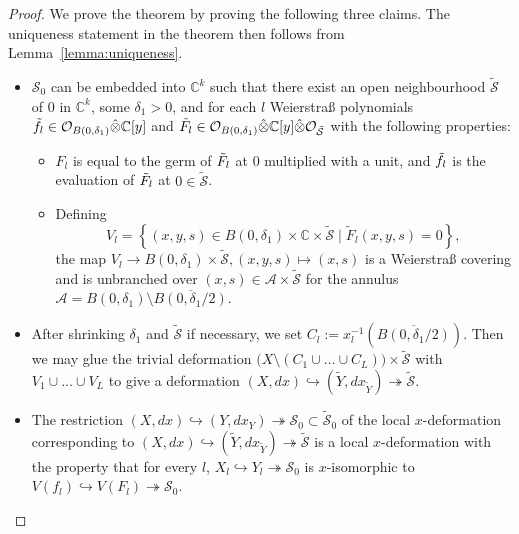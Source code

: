 \documentclass[11pt,twoside]{amsart}
\theoremstyle{plain}
\newcommand{\Am}{\mathcal{A}}
\newcommand{\Sm}{\mathcal{S}}
\newcommand{\Sh}[1]{\mathcal{#1}} %
\newcommand{\dfx}{dx}
\begin{document}
\begin{proof}
We prove the theorem by proving the following three claims. The uniqueness statement in the theorem then follows from Lemma~\ref{lemma:uniqueness}. 
\begin{itemize}
	\item[\emph{Claim 1.}] $\Sh{S}_0$ can be embedded into $\mathbb{C}^k$ such that there exist an open neighbourhood $\tilde{\Sh{S}}$ of $0$ in $\mathbb{C}^k$, some $\delta_1 > 0$, and for each $l$ Weierstra{\ss} polynomials $\Tilde{f}_l \in \Sh{O}_{B(0,\delta_1)} \Hat{\otimes} \mathbb{C}[y]$ and $\Tilde{F}_l \in \Sh{O}_{B(0,\delta_1)} \Hat{\otimes} \mathbb{C}[y] \Hat{\otimes} \Sh{O}_{\tilde{\Sh{S}}}$ with the following properties: 
	\begin{itemize}
		\item 
		$F_l$ is equal to the germ of $\Tilde{F}_l$ at $0$ multiplied with a unit, and $\Tilde{f}_l$ is the evaluation of $\Tilde{F}_l$ at $0\in \tilde{\Sh{S}}$. 
		\item Defining
		\[V_l=\left\{(x, y,s)\in B(0,\delta_1)\times\mathbb{C}\times\tilde{\Sh{S}}\mid \tilde{F}_l(x,y,s)=0\right\},\]
		the map $V_l \rightarrow B(0,\delta_1)\times\tilde{\Sh{S}},(x,y,s) \mapsto(x,s)$
		is a Weierstra{\ss} covering and is unbranched over $(x,s)\in\Am\times\tilde{\Sh{S}}$ for the annulus $			\Am=B(0,\delta_1)\setminus\overline{B(0,\delta_1/2)}$.
	\end{itemize}		
	\item[\emph{Claim 2.}] After shrinking $\delta_1 $ and $\tilde{\Sh{S}}$ if necessary, we set $C_l:=x_l^{-1} (\overline{B(0,\delta_1/2)})$. Then we may glue the trivial deformation $\big(X\setminus(C_1\cup\ldots\cup C_L)\big)\times\tilde{\Sh{S}}$ with $V_1\cup\ldots\cup V_L$ to give a deformation $(X,\dfx)\hookrightarrow(\tilde{Y},\dfx_{\tilde{Y}})\twoheadrightarrow\tilde{\Sh{S}}$.
	\item[\emph{Claim 3.}] The restriction $(X,\dfx)\hookrightarrow(Y,\dfx_{Y})\twoheadrightarrow{\Sh{S}}_0 \subset \tilde{\Sh{S}}_0$ of the local $x$-deformation corresponding to  $(X,\dfx)\hookrightarrow(\tilde{Y},\dfx_{\tilde{Y}})\twoheadrightarrow\tilde{\Sh{S}}$ is a local $x$-deformation with the property that for every $l$, $X_l\hookrightarrow Y_l\twoheadrightarrow{\Sh{S}}_0$ is $x$-isomorphic to $V(f_l)\hookrightarrow V(F_l)\twoheadrightarrow\Sm_0$. 
\end{itemize}
	


\end{proof}
\end{document}
